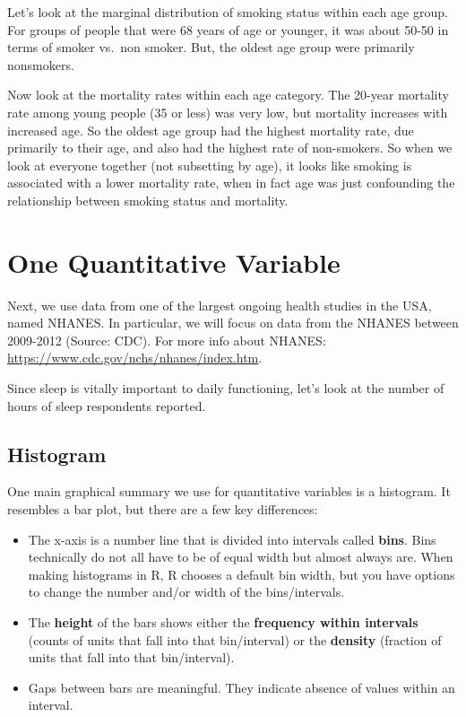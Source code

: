 \documentclass[
]{book}
\providecommand{\tightlist}{%
  \setlength{\itemsep}{0pt}\setlength{\parskip}{0pt}}
\begin{document}
Let's look at the marginal distribution of smoking status within each age group. For groups of people that were 68 years of age or younger, it was about 50-50 in terms of smoker vs.~non smoker. But, the oldest age group were primarily nonsmokers.

Now look at the mortality rates within each age category. The 20-year mortality rate among young people (35 or less) was very low, but mortality increases with increased age. So the oldest age group had the highest mortality rate, due primarily to their age, and also had the highest rate of non-smokers. So when we look at everyone together (not subsetting by age), it looks like smoking is associated with a lower mortality rate, when in fact age was just confounding the relationship between smoking status and mortality.

\hypertarget{one-quantitative-variable}{%
\section{One Quantitative Variable}\label{one-quantitative-variable}}

Next, we use data from one of the largest ongoing health studies in the USA, named NHANES. In particular, we will focus on data from the NHANES between 2009-2012 (Source: CDC). For more info about NHANES: \url{https://www.cdc.gov/nchs/nhanes/index.htm}.

Since sleep is vitally important to daily functioning, let's look at the number of hours of sleep respondents reported.

\hypertarget{histogram}{%
\subsection{Histogram}\label{histogram}}

One main graphical summary we use for quantitative variables is a histogram. It resembles a bar plot, but there are a few key differences:

\begin{itemize}
\tightlist
\item
  The x-axis is a number line that is divided into intervals called \textbf{bins}. Bins technically do not all have to be of equal width but almost always are. When making histograms in R, R chooses a default bin width, but you have options to change the number and/or width of the bins/intervals.
\item
  The \textbf{height} of the bars shows either the \textbf{frequency within intervals} (counts of units that fall into that bin/interval) or the \textbf{density} (fraction of units that fall into that bin/interval).
\item
  Gaps between bars are meaningful. They indicate absence of values within an interval.
\end{itemize}
\end{document}
